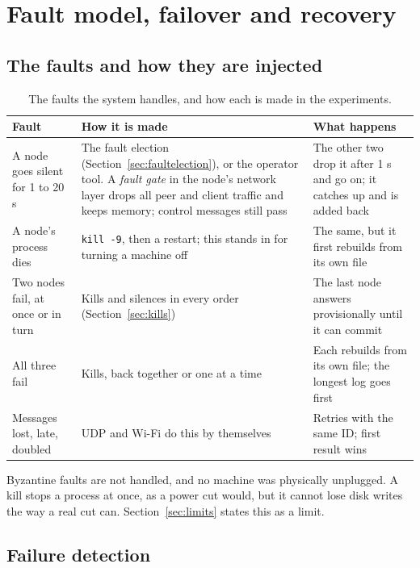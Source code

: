 \section{Fault model, failover and recovery}
\label{sec:faults}

\subsection{The faults and how they are injected}

\begin{table}[!htb]
\centering\small
\caption{The faults the system handles, and how each is made in the experiments.}
\label{tab:faultmodel}
\begin{tabularx}{\linewidth}{@{}P{3.3cm}LL@{}}
\toprule
Fault & How it is made & What happens \\
\midrule
A node goes silent for 1 to 20 s & The fault election (Section~\ref{sec:faultelection}), or the operator tool. A \emph{fault gate} in the node's network layer drops all peer and client traffic and keeps memory; control messages still pass & The other two drop it after 1 s and go on; it catches up and is added back \\
A node's process dies & \texttt{kill -9}, then a restart; this stands in for turning a machine off & The same, but it first rebuilds from its own file \\
Two nodes fail, at once or in turn & Kills and silences in every order (Section~\ref{sec:kills}) & The last node answers provisionally until it can commit \\
All three fail & Kills, back together or one at a time & Each rebuilds from its own file; the longest log goes first \\
Messages lost, late, doubled & UDP and Wi-Fi do this by themselves & Retries with the same ID; first result wins \\
\bottomrule
\end{tabularx}
\end{table}

Byzantine faults are not handled, and no machine was physically unplugged. A kill stops a process at once, as a power cut would, but it cannot lose disk writes the way a real cut can. Section~\ref{sec:limits} states this as a limit.

\subsection{Failure detection}

